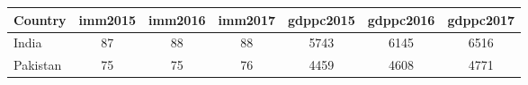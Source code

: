 \begin{tabular}{lccc ccc}
\toprule
Country & imm2015 & imm2016 & imm2017 & gdppc2015 & gdppc2016 & gdppc2017  \\
\midrule
India&87&88&88&5743 &6145&6516\\
Pakistan&75&75&76&4459 & 4608 &4771\\
\bottomrule
\end{tabular}
